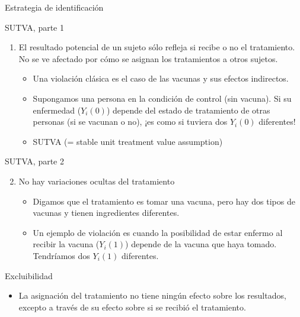 \documentclass[
  ignorenonframetext,
]{beamer}
\begin{document}
\begin{frame}{Estrategia de identificación}
\begin{frame}{SUTVA, parte 1}
\protect\hypertarget{sutva-parte-1}{}
\begin{enumerate}
\item
  El resultado potencial de un sujeto sólo refleja si recibe o no el
  tratamiento. No se ve afectado por cómo se asignan los tratamientos a
  otros sujetos.

  \begin{itemize}
  \item
    Una violación clásica es el caso de las vacunas y sus efectos
    indirectos.
  \item
    Supongamos una persona en la condición de control (sin vacuna). Si
    su enfermedad (\(Y_i(0)\)) depende del estado de tratamiento de
    otras personas (si se vacunan o no), ¡es como si tuviera dos
    \(Y_i(0)\) diferentes!
  \item
    SUTVA (= stable unit treatment value assumption)
  \end{itemize}
\end{enumerate}
\end{frame}

\begin{frame}{SUTVA, parte 2}
\protect\hypertarget{sutva-parte-2}{}
\begin{enumerate}
\setcounter{enumi}{1}
\item
  No hay variaciones ocultas del tratamiento

  \begin{itemize}
  \item
    Digamos que el tratamiento es tomar una vacuna, pero hay dos tipos
    de vacunas y tienen ingredientes diferentes.
  \item
    Un ejemplo de violación es cuando la posibilidad de estar enfermo al
    recibir la vacuna (\(Y_i(1)\)) depende de la vacuna que haya tomado.
    Tendríamos dos \(Y_i(1)\) diferentes.
  \end{itemize}
\end{enumerate}
\end{frame}

\begin{frame}{Excluibilidad}
\protect\hypertarget{excluibilidad}{}
\begin{itemize}
\item
  La asignación del tratamiento no tiene ningún efecto sobre los
  resultados, excepto a través de su efecto sobre si se recibió el
  tratamiento.


\end{itemize}
\end{frame}
\end{frame}
\end{document}

